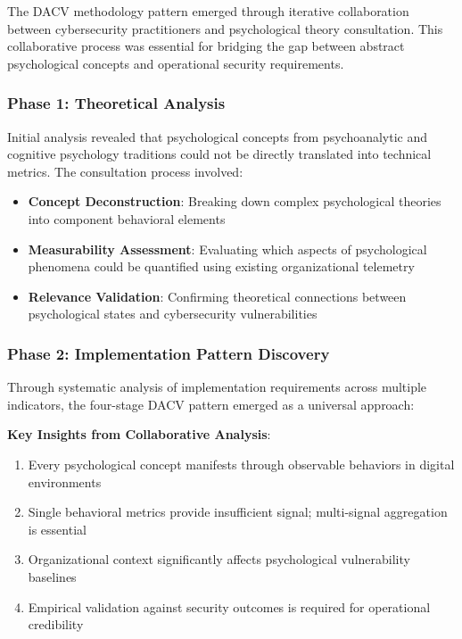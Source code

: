 \documentclass[11pt, onecolumn]{article}
\begin{document}
The DACV methodology pattern emerged through iterative collaboration between cybersecurity practitioners and psychological theory consultation. This collaborative process was essential for bridging the gap between abstract psychological concepts and operational security requirements.

\subsubsection{Phase 1: Theoretical Analysis}

Initial analysis revealed that psychological concepts from psychoanalytic and cognitive psychology traditions could not be directly translated into technical metrics. The consultation process involved:

\begin{itemize}
\item \textbf{Concept Deconstruction}: Breaking down complex psychological theories into component behavioral elements
\item \textbf{Measurability Assessment}: Evaluating which aspects of psychological phenomena could be quantified using existing organizational telemetry
\item \textbf{Relevance Validation}: Confirming theoretical connections between psychological states and cybersecurity vulnerabilities
\end{itemize}

\subsubsection{Phase 2: Implementation Pattern Discovery}

Through systematic analysis of implementation requirements across multiple indicators, the four-stage DACV pattern emerged as a universal approach:

\textbf{Key Insights from Collaborative Analysis}:
\begin{enumerate}
\item Every psychological concept manifests through observable behaviors in digital environments
\item Single behavioral metrics provide insufficient signal; multi-signal aggregation is essential
\item Organizational context significantly affects psychological vulnerability baselines
\item Empirical validation against security outcomes is required for operational credibility
\end{enumerate}
\end{document}
